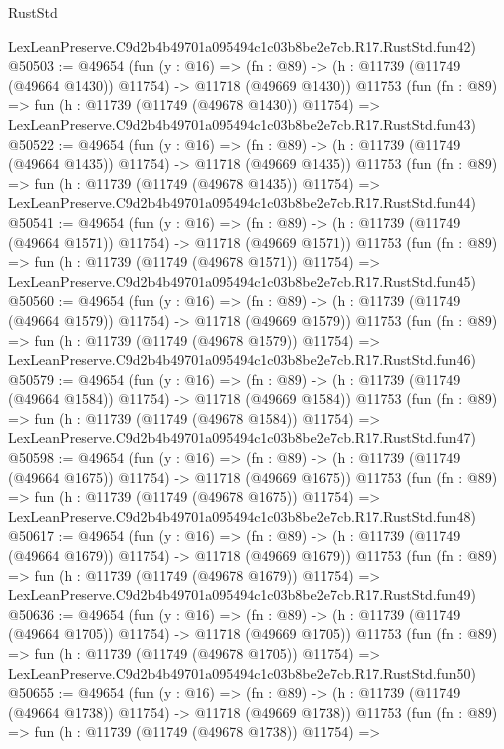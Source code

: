 \begin{lexlean}{RustStd}
\begin{coremodule}
    LexLeanPreserve.C9d2b4b49701a095494c1c03b8be2e7cb.R17.RustStd.fun42)
@50503 := @49654
    (fun (y : @16) =>
    (fn : @89) -> (h : @11739 (@11749 (@49664 @1430)) @11754) -> @11718 (@49669 @1430))
    @11753
    (fun (fn : @89) =>
    fun (h : @11739 (@11749 (@49678 @1430)) @11754) =>
    LexLeanPreserve.C9d2b4b49701a095494c1c03b8be2e7cb.R17.RustStd.fun43)
@50522 := @49654
    (fun (y : @16) =>
    (fn : @89) -> (h : @11739 (@11749 (@49664 @1435)) @11754) -> @11718 (@49669 @1435))
    @11753
    (fun (fn : @89) =>
    fun (h : @11739 (@11749 (@49678 @1435)) @11754) =>
    LexLeanPreserve.C9d2b4b49701a095494c1c03b8be2e7cb.R17.RustStd.fun44)
@50541 := @49654
    (fun (y : @16) =>
    (fn : @89) -> (h : @11739 (@11749 (@49664 @1571)) @11754) -> @11718 (@49669 @1571))
    @11753
    (fun (fn : @89) =>
    fun (h : @11739 (@11749 (@49678 @1571)) @11754) =>
    LexLeanPreserve.C9d2b4b49701a095494c1c03b8be2e7cb.R17.RustStd.fun45)
@50560 := @49654
    (fun (y : @16) =>
    (fn : @89) -> (h : @11739 (@11749 (@49664 @1579)) @11754) -> @11718 (@49669 @1579))
    @11753
    (fun (fn : @89) =>
    fun (h : @11739 (@11749 (@49678 @1579)) @11754) =>
    LexLeanPreserve.C9d2b4b49701a095494c1c03b8be2e7cb.R17.RustStd.fun46)
@50579 := @49654
    (fun (y : @16) =>
    (fn : @89) -> (h : @11739 (@11749 (@49664 @1584)) @11754) -> @11718 (@49669 @1584))
    @11753
    (fun (fn : @89) =>
    fun (h : @11739 (@11749 (@49678 @1584)) @11754) =>
    LexLeanPreserve.C9d2b4b49701a095494c1c03b8be2e7cb.R17.RustStd.fun47)
@50598 := @49654
    (fun (y : @16) =>
    (fn : @89) -> (h : @11739 (@11749 (@49664 @1675)) @11754) -> @11718 (@49669 @1675))
    @11753
    (fun (fn : @89) =>
    fun (h : @11739 (@11749 (@49678 @1675)) @11754) =>
    LexLeanPreserve.C9d2b4b49701a095494c1c03b8be2e7cb.R17.RustStd.fun48)
@50617 := @49654
    (fun (y : @16) =>
    (fn : @89) -> (h : @11739 (@11749 (@49664 @1679)) @11754) -> @11718 (@49669 @1679))
    @11753
    (fun (fn : @89) =>
    fun (h : @11739 (@11749 (@49678 @1679)) @11754) =>
    LexLeanPreserve.C9d2b4b49701a095494c1c03b8be2e7cb.R17.RustStd.fun49)
@50636 := @49654
    (fun (y : @16) =>
    (fn : @89) -> (h : @11739 (@11749 (@49664 @1705)) @11754) -> @11718 (@49669 @1705))
    @11753
    (fun (fn : @89) =>
    fun (h : @11739 (@11749 (@49678 @1705)) @11754) =>
    LexLeanPreserve.C9d2b4b49701a095494c1c03b8be2e7cb.R17.RustStd.fun50)
@50655 := @49654
    (fun (y : @16) =>
    (fn : @89) -> (h : @11739 (@11749 (@49664 @1738)) @11754) -> @11718 (@49669 @1738))
    @11753
    (fun (fn : @89) =>
    fun (h : @11739 (@11749 (@49678 @1738)) @11754) =>

\end{coremodule}
\end{lexlean}

